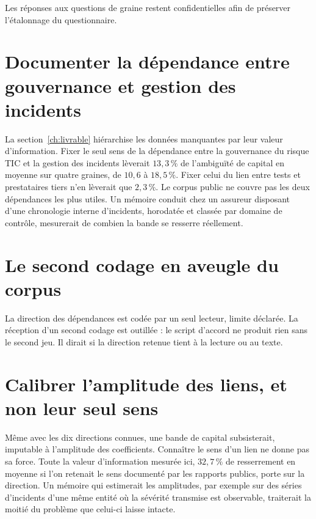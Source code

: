 Les réponses aux questions de graine restent confidentielles afin de préserver l'étalonnage du questionnaire.

\section{Documenter la dépendance entre gouvernance et gestion des incidents}

La section~\ref{ch:livrable} hiérarchise les données manquantes par leur valeur d'information.
Fixer le seul sens de la dépendance entre la gouvernance du risque TIC et la gestion des incidents
lèverait $13{,}3\,\%$ de l'ambiguïté de capital en moyenne sur quatre graines, de $10{,}6$ à
$18{,}5\,\%$. Fixer celui du lien entre tests et prestataires tiers n'en lèverait que $2{,}3\,\%$.
Le corpus public ne couvre pas les deux dépendances les plus utiles. Un mémoire conduit chez un
assureur disposant d'une chronologie interne d'incidents, horodatée et classée par domaine de
contrôle, mesurerait de combien la bande se resserre réellement.


\section{Le second codage en aveugle du corpus}

La direction des dépendances est codée par un seul lecteur, limite déclarée. La réception d'un
second codage est outillée : le script d'accord ne produit rien sans le second jeu. Il dirait si la
direction retenue tient à la lecture ou au texte.

\section{Calibrer l'amplitude des liens, et non leur seul sens}

Même avec les dix directions connues, une bande de capital subsisterait, imputable à l'amplitude des
coefficients. Connaître le sens d'un lien ne donne pas sa force. Toute la valeur d'information
mesurée ici, $32{,}7\,\%$ de resserrement en moyenne si l'on retenait le sens documenté par les
rapports publics, porte sur la direction. Un mémoire qui estimerait les amplitudes, par exemple sur
des séries d'incidents d'une même entité où la sévérité transmise est observable, traiterait la moitié
du problème que celui-ci laisse intacte.


